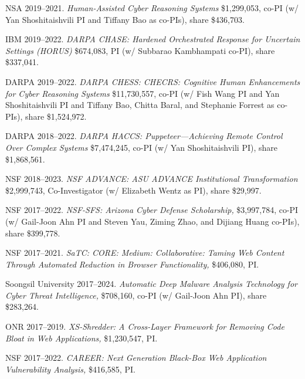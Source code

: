 \documentclass[11pt,letterpaper,sans]{moderncv}
\begin{document}
\begin{etaremune}


  \item NSA 2019--2021. \textit{Human-Assisted Cyber Reasoning Systems} \$1,299,053, co-PI (w/ Yan Shoshitaishvili PI and Tiffany Bao as co-PIs), share \$436,703.

  \item IBM 2019--2022. \textit{DARPA CHASE: Hardened Orchestrated Response for Uncertain Settings (HORUS)} \$674,083, PI (w/ Subbarao Kambhampati co-PI), share \$337,041.

  \item DARPA 2019--2022. \textit{DARPA CHESS: CHECRS: Cognitive Human Enhancements for Cyber Reasoning Systems} \$11,730,557, co-PI (w/ Fish Wang PI and Yan Shoshitaishvili PI and Tiffany Bao, Chitta Baral, and Stephanie Forrest as co-PIs), share \$1,524,972.

  \item DARPA 2018--2022. \textit{DARPA HACCS: Puppeteer---Achieving Remote Control Over Complex Systems} \$7,474,245, co-PI (w/ Yan Shoshitaishvili PI), share \$1,868,561.

  \item NSF 2018--2023. \textit{NSF ADVANCE: ASU ADVANCE Institutional Transformation} \$2,999,743, Co-Investigator (w/ Elizabeth Wentz as PI), share \$29,997.
  
  \item NSF 2017--2022. \textit{NSF-SFS: Arizona Cyber Defense
    Scholarship,} \$3,997,784, co-PI (w/ Gail-Joon Ahn PI and Steven
    Yau, Ziming Zhao, and Dijiang Huang co-PIs), share \$399,778.

  \item NSF 2017--2021. \textit{SaTC: CORE: Medium: Collaborative:
    Taming Web Content Through Automated Reduction in Browser
    Functionality,} \$406,080, PI.

  \item Soongsil University 2017--2024. \textit{Automatic Deep Malware
    Analysis Technology for Cyber Threat Intelligence,} \$708,160,
    co-PI (w/ Gail-Joon Ahn PI), share \$283,264.

  \item ONR 2017--2019. \textit{XS-Shredder: A Cross-Layer Framework
    for Removing Code Bloat in Web Applications,} \$1,230,547, PI.

  \item NSF 2017--2022. \textit{CAREER: Next Generation Black-Box Web
    Application Vulnerability Analysis,} \$416,585, PI.
  

\end{etaremune}
\end{document}
